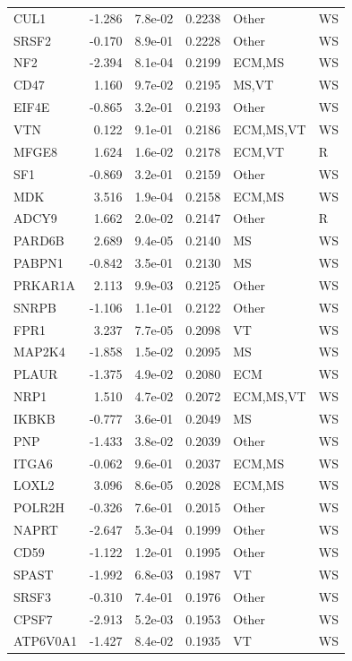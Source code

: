 \begin{table}[ht]
\begin{tabular}{lrlrll}
  CUL1 & -1.286 & 7.8e-02 & 0.2238 & Other & WS \\ 
  SRSF2 & -0.170 & 8.9e-01 & 0.2228 & Other & WS \\ 
  NF2 & -2.394 & 8.1e-04 & 0.2199 & ECM,MS & WS \\ 
  CD47 & 1.160 & 9.7e-02 & 0.2195 & MS,VT & WS \\ 
  EIF4E & -0.865 & 3.2e-01 & 0.2193 & Other & WS \\ 
  VTN & 0.122 & 9.1e-01 & 0.2186 & ECM,MS,VT & WS \\ 
  MFGE8 & 1.624 & 1.6e-02 & 0.2178 & ECM,VT & R \\ 
  SF1 & -0.869 & 3.2e-01 & 0.2159 & Other & WS \\ 
  MDK & 3.516 & 1.9e-04 & 0.2158 & ECM,MS & WS \\ 
  ADCY9 & 1.662 & 2.0e-02 & 0.2147 & Other & R \\ 
  PARD6B & 2.689 & 9.4e-05 & 0.2140 & MS & WS \\ 
  PABPN1 & -0.842 & 3.5e-01 & 0.2130 & MS & WS \\ 
  PRKAR1A & 2.113 & 9.9e-03 & 0.2125 & Other & WS \\ 
  SNRPB & -1.106 & 1.1e-01 & 0.2122 & Other & WS \\ 
  FPR1 & 3.237 & 7.7e-05 & 0.2098 & VT & WS \\ 
  MAP2K4 & -1.858 & 1.5e-02 & 0.2095 & MS & WS \\ 
  PLAUR & -1.375 & 4.9e-02 & 0.2080 & ECM & WS \\ 
  NRP1 & 1.510 & 4.7e-02 & 0.2072 & ECM,MS,VT & WS \\ 
  IKBKB & -0.777 & 3.6e-01 & 0.2049 & MS & WS \\ 
  PNP & -1.433 & 3.8e-02 & 0.2039 & Other & WS \\ 
  ITGA6 & -0.062 & 9.6e-01 & 0.2037 & ECM,MS & WS \\ 
  LOXL2 & 3.096 & 8.6e-05 & 0.2028 & ECM,MS & WS \\ 
  POLR2H & -0.326 & 7.6e-01 & 0.2015 & Other & WS \\ 
  NAPRT & -2.647 & 5.3e-04 & 0.1999 & Other & WS \\ 
  CD59 & -1.122 & 1.2e-01 & 0.1995 & Other & WS \\ 
  SPAST & -1.992 & 6.8e-03 & 0.1987 & VT & WS \\ 
  SRSF3 & -0.310 & 7.4e-01 & 0.1976 & Other & WS \\ 
  CPSF7 & -2.913 & 5.2e-03 & 0.1953 & Other & WS \\ 
  ATP6V0A1 & -1.427 & 8.4e-02 & 0.1935 & VT & WS \\ 

\end{tabular}
\end{table}
